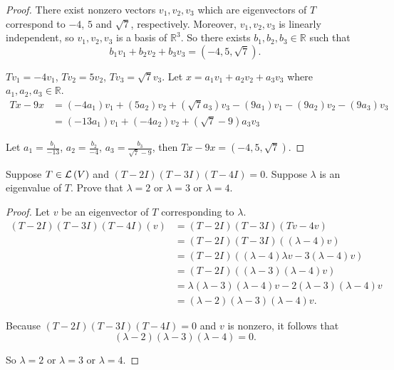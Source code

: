 \begin{proof}
    There exist nonzero vectors $v_{1}, v_{2}, v_{3}$ which are eigenvectors of $T$ correspond to  $-4$, $5$ and $\sqrt{7}$, respectively. Moreover, $v_{1}, v_{2}, v_{3}$ is linearly independent, so $v_{1}, v_{2}, v_{3}$ is a basis of $\mathbb{R}^{3}$. So there exists $b_{1}, b_{2}, b_{3}\in\mathbb{R}$ such that
    \[
        b_{1}v_{1} + b_{2}v_{2} + b_{3}v_{3} = (-4, 5, \sqrt{7}).
    \]

    $Tv_{1} = -4v_{1}$, $Tv_{2} = 5v_{2}$, $Tv_{3} = \sqrt{7}v_{3}$. Let $x = a_{1}v_{1} + a_{2}v_{2} + a_{3}v_{3}$ where $a_{1}, a_{2}, a_{3}\in\mathbb{R}$.
    \begin{align*}
        Tx - 9x & = (-4a_{1})v_{1} + (5a_{2})v_{2} + (\sqrt{7}a_{3})v_{3} - (9a_{1})v_{1} - (9a_{2})v_{2} - (9a_{3})v_{3} \\
                & = (-13a_{1})v_{1} + (-4a_{2})v_{2} + (\sqrt{7} - 9)a_{3}v_{3}
    \end{align*}

    Let $a_{1} = \frac{b_{1}}{-13}$, $a_{2} = \frac{b_{2}}{-4}$, $a_{3} = \frac{b_{3}}{\sqrt{7} - 9}$, then $Tx - 9x = (-4, 5, \sqrt{7})$.
\end{proof}
\newpage

\begin{exercise}
    Suppose $T\in\mathcal{L}\left({V}\right)$ and $(T - 2I)(T - 3I)(T - 4I) = 0$. Suppose $\lambda$ is an eigenvalue of $T$. Prove that $\lambda = 2$ or $\lambda = 3$ or $\lambda = 4$.
\end{exercise}

\begin{proof}
    Let $v$ be an eigenvector of $T$ corresponding to $\lambda$.
    \begin{align*}
        (T - 2I)(T - 3I)(T - 4I)(v) & = (T - 2I)(T - 3I)(Tv - 4v)                                          \\
                                    & = (T - 2I)(T - 3I)((\lambda - 4)v)                                   \\
                                    & = (T - 2I)((\lambda - 4)\lambda v - 3(\lambda - 4)v)                 \\
                                    & = (T - 2I)((\lambda - 3)(\lambda - 4)v)                              \\
                                    & = \lambda (\lambda - 3)(\lambda - 4)v - 2(\lambda - 3)(\lambda - 4)v \\
                                    & = (\lambda - 2)(\lambda - 3)(\lambda - 4)v.
    \end{align*}

    Because $(T - 2I)(T - 3I)(T - 4I) = 0$ and $v$ is nonzero, it follows that
    \[
        (\lambda - 2)(\lambda - 3)(\lambda - 4) = 0.
    \]

    So $\lambda = 2$ or $\lambda = 3$ or $\lambda = 4$.
\end{proof}
\newpage

